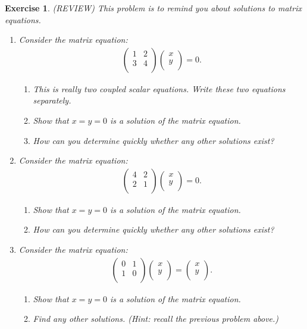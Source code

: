 \documentclass{book}
\newtheorem{exercise}{Exercise}
\def\beq{\begin{eqnarray}}
\def\eeq{\end{eqnarray}}
\begin{document}
\begin{exercise}
(REVIEW) This problem is to remind you about solutions to matrix equations.
\begin{enumerate}
\item Consider the matrix equation:
\beq
\left(
\begin{array}{cc}
1 & 2 \\
3 & 4\\
\end{array}
\right)
\left(
\begin{array}{c}
x\\
y\\
\end{array}
\right) = 0.
\eeq
\begin{enumerate}
\item This is really two coupled scalar equations. Write these two
equations separately. 
\item Show that $x=y=0$ is a solution of the matrix equation.
\item How can you determine quickly whether any other solutions exist? 
\end{enumerate}
\item Consider the matrix equation:
\beq
\left(
\begin{array}{cc}
4 & 2 \\
2 & 1\\
\end{array}
\right)
\left(
\begin{array}{c}
x\\
y\\
\end{array}
\right) = 0.
\eeq
\begin{enumerate}
\item Show that $x=y=0$ is a solution of the matrix equation.
\item How can you determine quickly whether any other solutions exist? 
\end{enumerate}

\item Consider the matrix equation:
\beq
\left(
\begin{array}{cc}
0 & 1 \\
1 & 0\\
\end{array}
\right)
\left(
\begin{array}{c}
x\\
y\\
\end{array}
\right) =
\left(
\begin{array}{c}
x\\
y\\
\end{array}
\right).
\eeq
\begin{enumerate}
\item Show that $x=y=0$ is a solution of the matrix equation.
\item Find any other solutions. (Hint: recall the previous problem above.)
\end{enumerate}

\end{enumerate}
\end{exercise}
\end{document}
